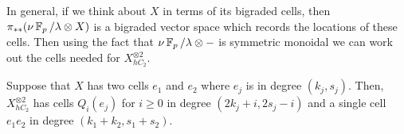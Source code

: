 In general, if we think about $X$ in terms of its bigraded cells, then $\pi_{**}(\nu\operatorname{\mathbb{F}}_p/\lambda \otimes X)$ is a bigraded vector space which records the locations of these cells. Then using the fact that $\nu\operatorname{\mathbb{F}}_p/\lambda \otimes -$ is symmetric monoidal we can work out the cells needed for $X^{\otimes 2}_{hC_2}$.

\begin{exm}
  Suppose that $X$ has two cells $e_1$ and $e_2$ where $e_j$ is in degree $(k_j,s_j)$.
  Then, $X^{\otimes 2}_{hC_2}$ has cells $Q_i(e_j)$ for $i \geq 0$ in degree $(2k_j+i, 2s_j-i)$ and a single cell $e_1e_2$ in degree $(k_1+k_2,s_1+s_2)$.
\end{exm}

  









